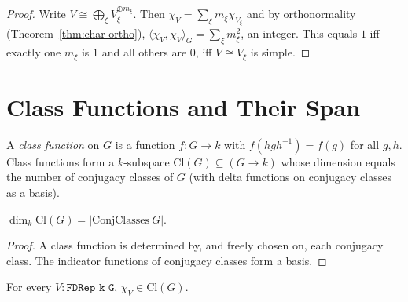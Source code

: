 \begin{proof}
  Write $V \cong \bigoplus_\xi V_\xi^{\oplus m_\xi}$. Then
  $\chi_V = \sum_\xi m_\xi \chi_{V_\xi}$ and by orthonormality
  (Theorem~\ref{thm:char-ortho}),
  $\langle \chi_V, \chi_V\rangle_G = \sum_\xi m_\xi^2$, an integer.
  This equals $1$ iff exactly one $m_\xi$ is $1$ and all others are $0$, iff
  $V \cong V_\xi$ is simple.
\end{proof}

\section{Class Functions and Their Span}

\begin{definition}
  \label{def:class-functions}
  A \emph{class function} on $G$ is a function $f : G \to k$ with
  $f(hgh^{-1}) = f(g)$ for all $g, h$. Class functions form a $k$-subspace
  $\mathrm{Cl}(G) \subseteq (G \to k)$ whose dimension equals the number of
  conjugacy classes of $G$ (with delta functions on conjugacy classes as a
  basis).
\end{definition}

\begin{lemma}[$\dim_k \mathrm{Cl}(G) = $ number of conjugacy classes]
  \label{lem:dim-cl-G}
  $\dim_k \mathrm{Cl}(G) = |\mathrm{ConjClasses}\ G|$.
\end{lemma}

\begin{proof}
  A class function is determined by, and freely chosen on, each conjugacy
  class. The indicator functions of conjugacy classes form a basis.
\end{proof}

\begin{lemma}
  \label{lem:char-in-cl}
  For every $V : \texttt{FDRep k G}$, $\chi_V \in \mathrm{Cl}(G)$.
\end{lemma}

